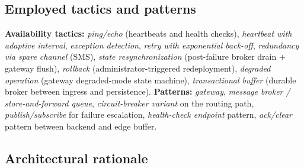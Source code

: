 \subsection*{Employed tactics and patterns}
\textbf{Availability tactics:} \emph{ping/echo} (heartbeats and health
checks), \emph{heartbeat with adaptive interval}, \emph{exception
detection}, \emph{retry with exponential back-off}, \emph{redundancy via
spare channel} (SMS), \emph{state resynchronization} (post-failure broker
drain + gateway flush), \emph{rollback} (administrator-triggered
redeployment), \emph{degraded operation} (gateway degraded-mode state
machine), \emph{transactional buffer} (durable broker between ingress and
persistence).
\textbf{Patterns:} \emph{gateway}, \emph{message broker / store-and-forward
queue}, \emph{circuit-breaker variant} on the routing path,
\emph{publish/subscribe} for failure escalation,
\emph{health-check endpoint} pattern, \emph{ack/clear} pattern between
backend and edge buffer.

\subsection*{Architectural rationale}

